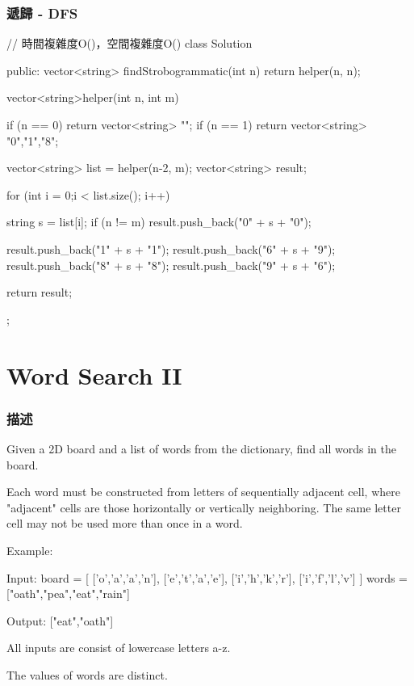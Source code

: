 \subsubsection{遞歸 - DFS}
\begin{Code}
// 時間複雜度O()，空間複雜度O()
class Solution {
public:
    vector<string> findStrobogrammatic(int n)
    {
        return helper(n, n);
    }

    vector<string>helper(int n, int m)
    {
        if (n == 0) return vector<string> {""};
        if (n == 1) return vector<string> {"0","1","8"};

        vector<string> list = helper(n-2, m);
        vector<string> result;

        for (int i = 0;i < list.size(); i++)
        {
            string s = list[i];
            if (n != m) result.push_back("0" + s + "0");

            result.push_back("1" + s + "1");
            result.push_back("6" + s + "9");
            result.push_back("8" + s + "8");
            result.push_back("9" + s + "6");
        }
        return result;
    }
};
\end{Code}

\section{Word Search II} %
\label{sec:word-search-ii}


\subsubsection{描述}
Given a 2D board and a list of words from the dictionary, find all words in the board.

Each word must be constructed from letters of sequentially adjacent cell, where "adjacent" cells are those horizontally or vertically neighboring. The same letter cell may not be used more than once in a word.

Example:
\begin{Code}
Input: 
board = [
  ['o','a','a','n'],
  ['e','t','a','e'],
  ['i','h','k','r'],
  ['i','f','l','v']
]
words = ["oath","pea","eat","rain"]

Output: ["eat","oath"]
\end{Code}

\begindot
\item All inputs are consist of lowercase letters a-z.
\item The values of words are distinct.
\myenddot

